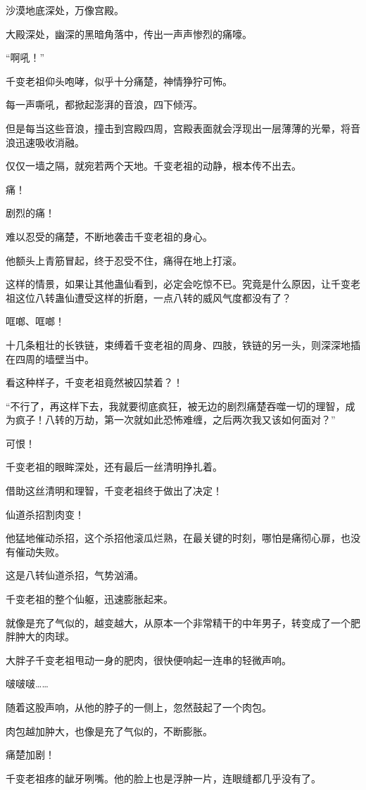 \begin{this_body}
沙漠地底深处，万像宫殿。

大殿深处，幽深的黑暗角落中，传出一声声惨烈的痛嚎。

“啊吼！”

千变老祖仰头咆哮，似乎十分痛楚，神情狰狞可怖。

每一声嘶吼，都掀起澎湃的音浪，四下倾泻。

但是每当这些音浪，撞击到宫殿四周，宫殿表面就会浮现出一层薄薄的光晕，将音浪迅速吸收消融。

仅仅一墙之隔，就宛若两个天地。千变老祖的动静，根本传不出去。

痛！

剧烈的痛！

难以忍受的痛楚，不断地袭击千变老祖的身心。

他额头上青筋冒起，终于忍受不住，痛得在地上打滚。

这样的情景，如果让其他蛊仙看到，必定会吃惊不已。究竟是什么原因，让千变老祖这位八转蛊仙遭受这样的折磨，一点八转的威风气度都没有了？

哐啷、哐啷！

十几条粗壮的长铁链，束缚着千变老祖的周身、四肢，铁链的另一头，则深深地插在四周的墙壁当中。

看这种样子，千变老祖竟然被囚禁着？！

“不行了，再这样下去，我就要彻底疯狂，被无边的剧烈痛楚吞噬一切的理智，成为疯子！八转的万劫，第一次就如此恐怖难缠，之后两次我又该如何面对？”

可恨！

千变老祖的眼眸深处，还有最后一丝清明挣扎着。

借助这丝清明和理智，千变老祖终于做出了决定！

仙道杀招割肉变！

他猛地催动杀招，这个杀招他滚瓜烂熟，在最关键的时刻，哪怕是痛彻心扉，也没有催动失败。

这是八转仙道杀招，气势汹涌。

千变老祖的整个仙躯，迅速膨胀起来。

就像是充了气似的，越变越大，从原本一个非常精干的中年男子，转变成了一个肥胖肿大的肉球。

大胖子千变老祖甩动一身的肥肉，很快便响起一连串的轻微声响。

啵啵啵……

随着这股声响，从他的脖子的一侧上，忽然鼓起了一个肉包。

肉包越加肿大，也像是充了气似的，不断膨胀。

痛楚加剧！

千变老祖疼的龇牙咧嘴。他的脸上也是浮肿一片，连眼缝都几乎没有了。


\end{this_body}
